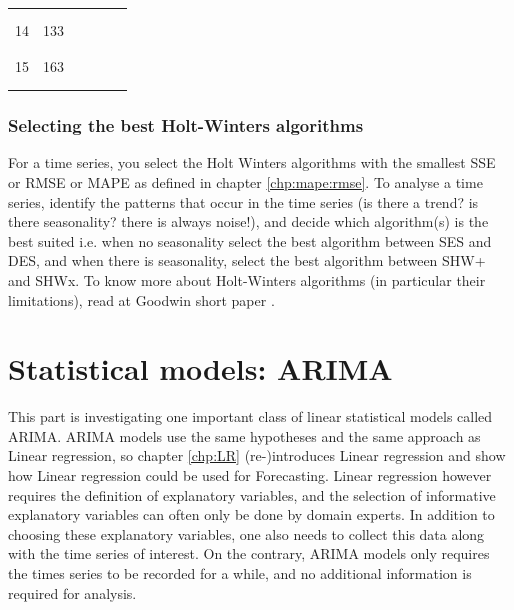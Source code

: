 \documentclass[a4paper,11pt,oneside,onecolumn]{book}
\begin{document}
\begin{center}
\begin{tabular}{|cc|p{3cm}p{3cm}p{3cm}|c|}
& & & & & \\

& & & & & \\

14 & 133 & & & & \\

& & & & & \\

& & & & & \\

15 & 163 & & & & \\

& & & & & \\

& & & & & \\ \hline

\end{tabular}

\end{center}

\section{Selecting the best Holt-Winters algorithms}

For a time series, you select the Holt Winters algorithms with the smallest SSE or RMSE or MAPE 
as defined in chapter \ref{chp:mape:rmse}.
To analyse a time series, identify the patterns that occur  in the time series (is there a trend? is there seasonality? there is always noise!), and decide which algorithm(s) is the best suited i.e.
when no seasonality select the best algorithm  between SES and DES, and when there is seasonality, select the best algorithm between SHW+ and SHWx. 
To know more about Holt-Winters algorithms (in particular their limitations),  read at Goodwin short paper   \cite{RePEc:for:ijafaa:y:2010:i:19:p:30-33}. 




\clearpage
\part{Statistical models: ARIMA}\label{part:ARIMA}

This part is investigating one important class of linear statistical models called ARIMA.
ARIMA models use the same hypotheses and the same approach  as Linear   regression, 
so chapter \ref{chp:LR} (re-)introduces Linear regression and show how Linear regression could be used for Forecasting.
Linear regression however requires the definition of explanatory variables, and the selection of informative explanatory variables can often only be done by domain experts.
In addition to choosing  these explanatory variables, one also needs to collect this data along with the time series of interest.
 On the contrary,  ARIMA models only requires the times series to be recorded for a while, and no additional information is required for analysis.
\end{document}
